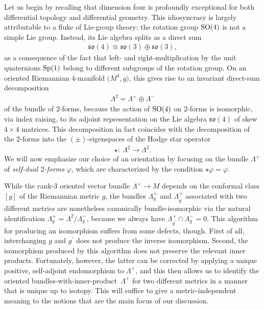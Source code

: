 \documentclass[10pt,a4paper]{amsart}
\numberwithin{equation}{section}
\begin{document}
 Let us begin by recalling
 that dimension four is profoundly exceptional for both differential topology and differential geometry.
 This idiosyncrasy is largely attributable to a fluke of Lie-group theory:
 the rotation group ${\rm SO}(4)$ is not a simple Lie group. Instead, its Lie algebra splits as a direct sum
 \begin{gather*}
{\mathfrak{so}}(4) \cong {\mathfrak{so}}(3)\oplus
 {\mathfrak{so}} (3),
\end{gather*}
 as a consequence of the fact that left- and right-multiplication by the unit quaternions ${\rm Sp}(1)$ belong to
 different subgroups of the rotation group. On an oriented Riemannian $4$-manifold $\big(M^4, g\big)$, this gives rise
 to an invariant direct-sum decomposition
\begin{gather*}
\Lambda^2 = \Lambda^+ \oplus \Lambda^-
\end{gather*}
of the bundle of $2$-forms, because the action of ${\rm SO}(4)$ on $2$-forms is isomorphic, via index raising, to
its adjoint representation on the Lie algebra ${\mathfrak{so}}(4)$ of skew $4\times 4$ matrices. This decomposition
in fact coincides with the decomposition of the $2$-forms into the $(\pm)$-eigenspaces of the Hodge star operator
\begin{gather*}
\star\colon \ \Lambda^2 \to \Lambda^2.
\end{gather*}
We will now emphasize our choice of an orientation by focusing on the bundle $\Lambda^+$ of
{\em self-dual $2$-forms} $\varphi$, which are characterized by the condition $\star \varphi = \varphi$.

While the rank-$3$ oriented vector bundle $\Lambda^+\to M$ depends on the conformal class $[g]$ of the Riemannian metric
$g$, the bundles $\Lambda^+_g$ and $\Lambda^+_{g^\prime}$ associated with two different metrics are nonetheless canonically
bundle-isomorphic via the natural identification $\Lambda^+_g = \Lambda^2/\Lambda^-_g$,
because we always have $\Lambda_{g^\prime}^+ \cap\Lambda_g^-= 0$. This algorithm for producing an isomorphism
suffers from some defects, though. First of all, interchanging $g$ and $g^\prime$ does not produce the inverse isomorphism. Second, the isomorphism produced by this algorithm does not preserve the relevant inner products.
Fortunately, however, the latter can be corrected by applying a unique positive, self-adjoint endomorphism to $\Lambda^+$,
and this then allows us to identify the oriented bundles-with-inner-product~$\Lambda^+$ for two different metrics in a manner
that is unique up to isotopy. This will suffice to give a metric-independent meaning to the notions that are the main focus of our discussion.
\end{document}
